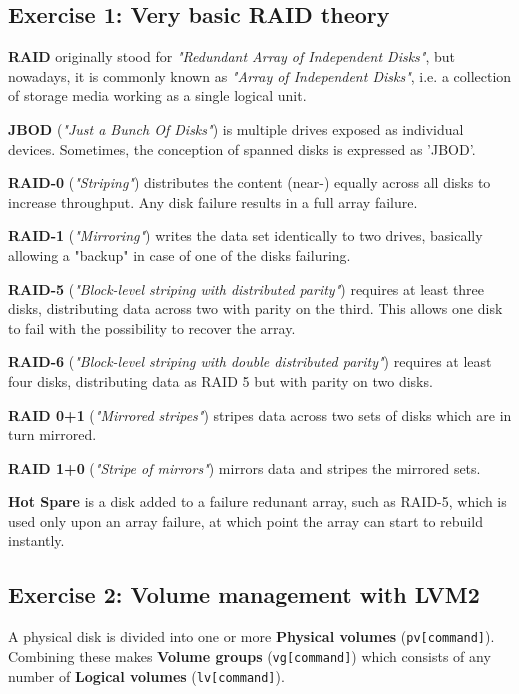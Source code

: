 
\subsection{Exercise 1: Very basic RAID theory}
\textbf{RAID} originally stood for \emph{"Redundant Array of Independent Disks"}, but
nowadays, it is commonly known as \emph{"Array of Independent Disks"}, i.e. a
collection of storage media working as a single logical unit.

\textbf{JBOD} (\emph{"Just a Bunch Of Disks"}) is multiple drives exposed as individual
devices. Sometimes, the conception of spanned disks is expressed as 'JBOD'.

\textbf{RAID-0} (\emph{"Striping"}) distributes the content (near-) equally across all disks to increase throughput. Any disk failure results in a full array failure.

\textbf{RAID-1} (\emph{"Mirroring"}) writes the data set identically to two drives, basically allowing a "backup" in case of one of the disks failuring.

\textbf{RAID-5} (\emph{"Block-level striping with distributed parity"}) requires at least three disks, distributing data across two with parity on the third. This allows one disk to fail with the possibility to recover the array.

\textbf{RAID-6} (\emph{"Block-level striping with double distributed parity"}) requires at least four disks, distributing data as RAID 5 but with parity on two disks.

\textbf{RAID 0+1} (\emph{"Mirrored stripes"}) stripes data across two sets of disks which are in turn mirrored.

\textbf{RAID 1+0} (\emph{"Stripe of mirrors"}) mirrors data and stripes the mirrored sets.

\textbf{Hot Spare} is a disk added to a failure redunant array, such as RAID-5, which is used only upon an array failure, at which point the array can start to rebuild instantly.

\subsection{Exercise 2: Volume management with LVM2}

A physical disk is divided into one or more \textbf{Physical volumes} (\verb=pv[command]=). Combining these makes  \textbf{Volume groups} (\verb=vg[command]=) which consists of any number of \textbf{Logical volumes} (\verb=lv[command]=).

